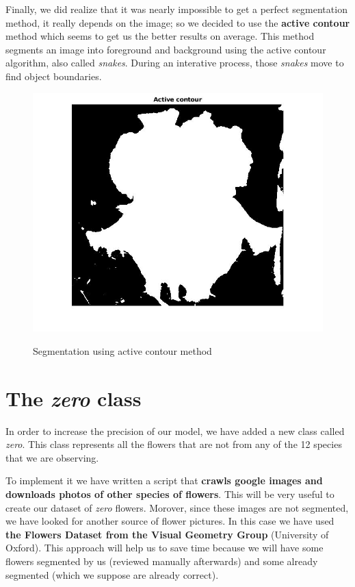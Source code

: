 \documentclass[11]{article}
\begin{document}
Finally, we did realize that it was nearly impossible to get a perfect segmentation method, it really depends on the image; so we decided to use the \textbf{active contour} method which seems to get us the better results on average. This method segments an image into foreground and background using the active contour algorithm, also called \textit{snakes}. During an interative process, those \textit{snakes} move to find object boundaries.

\begin{figure}[H]
    \centering
  \includegraphics[scale=0.30]{images/segmentation4.jpg}
    \label{segmentation4}
    \caption{Segmentation using active contour method}
\end{figure}


\section{The \textit{zero} class}

In order to increase the precision of our model, we have added a new class called \textit{zero}. This class represents all the flowers that are not from any of the 12 species that we are observing.
\medskip

To implement it we have written a script that \textbf{crawls google images and downloads photos of other species of flowers}. This will be very useful to create our dataset of \textit{zero} flowers. Morover, since these images are not segmented, we have looked for another source of flower pictures. In this case we have used \textbf{the Flowers Dataset from the Visual Geometry Group} (University of Oxford)\cite{Flower dataset}. This approach will help us to save time because we will have some flowers segmented by us (reviewed manually afterwards) and some already segmented (which we suppose are already correct).
\medskip
\end{document}
